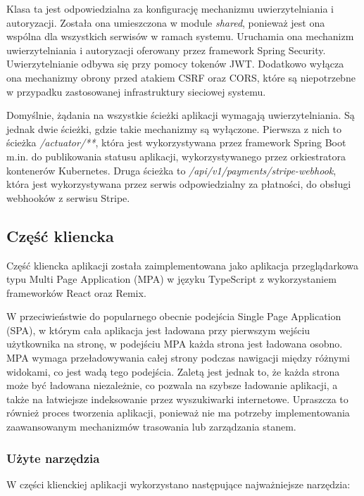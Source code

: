 Klasa ta jest odpowiedzialna za konfigurację mechanizmu uwierzytelniania i autoryzacji. Została ona umieszczona w module \textit{shared}, ponieważ jest ona wspólna dla wszystkich serwisów w ramach systemu. Uruchamia ona mechanizm uwierzytelniania i autoryzacji oferowany przez framework Spring Security. Uwierzytelnianie odbywa się przy pomocy tokenów JWT. Dodatkowo wyłącza ona mechanizmy obrony przed atakiem CSRF oraz CORS, które są niepotrzebne w przypadku zastosowanej infrastruktury sieciowej systemu.

Domyślnie, żądania na wszystkie ścieżki aplikacji wymagają uwierzytelniania. Są jednak dwie ścieżki, gdzie takie mechanizmy są wyłączone. Pierwsza z nich to ścieżka \textit{/actuator/**}, która jest wykorzystywana przez framework Spring Boot m.in. do publikowania statusu aplikacji, wykorzystywanego przez orkiestratora kontenerów Kubernetes. Druga ścieżka to \textit{/api/v1/payments/stripe-webhook}, która jest wykorzystywana przez serwis odpowiedzialny za płatności, do obsługi webhooków z serwisu Stripe.

\subsection{Część kliencka}

Część kliencka aplikacji została zaimplementowana jako aplikacja przeglądarkowa typu Multi Page Application (MPA) w języku TypeScript z wykorzystaniem frameworków React oraz Remix.

W przeciwieństwie do popularnego obecnie podejścia Single Page Application (SPA), w którym cała aplikacja jest ładowana przy pierwszym wejściu użytkownika na stronę, w podejściu MPA każda strona jest ładowana osobno. MPA wymaga przeładowywania całej strony podczas nawigacji między różnymi widokami, co jest wadą tego podejścia. Zaletą jest jednak to, że każda strona może być ładowana niezależnie, co pozwala na szybsze ładowanie aplikacji, a także na łatwiejsze indeksowanie przez wyszukiwarki internetowe. Upraszcza to również proces tworzenia aplikacji, ponieważ nie ma potrzeby implementowania zaawansowanym mechanizmów trasowania lub zarządzania stanem.

\subsubsection{Użyte narzędzia}

W części klienckiej aplikacji wykorzystano następujące najważniejsze narzędzia:

